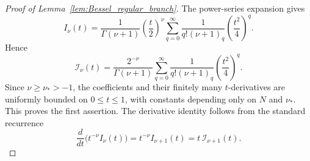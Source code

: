 \documentclass[12pt]{amsart}
\newtheorem{lemma}[theorem]{Lemma}
\begin{document}












\begin{proof}[Proof of Lemma~\ref{lem:Bessel_regular_branch}]
The power-series expansion gives
\begin{equation*}
I_\nu(t)=\frac{1}{\Gamma(\nu+1)}\left(\frac{t}{2}\right)^\nu\sum_{q=0}^\infty \frac{1}{q!(\nu+1)_q} \left(\frac{t^2}{4}\right)^q.
\end{equation*}
Hence
\begin{equation*}
\mathcal I_\nu(t) = \frac{2^{-\nu}}{\Gamma(\nu+1)} \sum_{q=0}^\infty \frac{1}{q!(\nu+1)_q} \left(\frac{t^2}{4}\right)^q.
\end{equation*}
Since $\nu\geq\nu_*>-1$, the coefficients and their finitely many $t$-derivatives are uniformly bounded on $0\leq t\leq1$, with constants depending only on $N$ and $\nu_*$. This proves the first assertion. The derivative identity follows from the standard recurrence
\begin{equation*}
\frac{d}{dt}\bigl(t^{-\nu}I_\nu(t)\bigr)=t^{-\nu}I_{\nu+1}(t) = t\,\mathcal I_{\nu+1}(t).
\end{equation*}

\end{proof}
\end{document}
